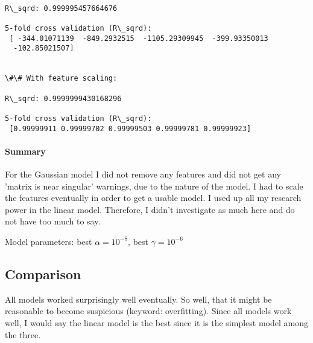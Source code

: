 \documentclass[11pt]{article}
\begin{document}
    \begin{Verbatim}[commandchars=\\\{\}]

R\_sqrd: 0.999995457664676

5-fold cross validation (R\_sqrd):
 [ -344.01071139  -849.2932515  -1105.29309945  -399.93350013
  -102.85021507]


\#\# With feature scaling:

R\_sqrd: 0.9999999430168296

5-fold cross validation (R\_sqrd):
 [0.99999911 0.99999702 0.99999503 0.99999781 0.99999923]

    \end{Verbatim}

    \paragraph{Summary}

For the Gaussian model I did not remove any features and did not get any
'matrix is near singular' warnings, due to the nature of the model. I
had to scale the features eventually in order to get a usable model. I
used up all my research power in the linear model. Therefore, I didn't
investigate as much here and do not have too much to say.\newline

Model parameters: best \(\alpha = 10^{-8}\), best \(\gamma = 10^{-6}\)

    \subsection{Comparison}\label{comparison}

    All models worked surprisingly well eventually. So well, that it might
be reasonable to become suspicious (keyword: overfitting). Since all
models work well, I would say the linear model is the best since it is
the simplest model among the three.


    
    
    
    
\end{document}
